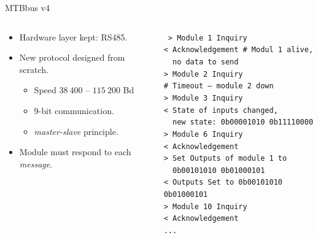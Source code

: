 \documentclass[aspectratio=169]{beamer}
\begin{document}
\begin{frame}{MTBbus v4}
\begin{columns}
	\begin{column}{.5\textwidth}
		\begin{itemize}
		\item Hardware layer kept: RS485.
		\item New protocol designed from scratch.
		\begin{itemize}
			\item Speed $38\ 400$ – $115\ 200$ Bd
			\item 9-bit communication.
			\item \textit{master-slave} principle.
		\end{itemize}
		\item Module must respond to each \textit{message}.
		\end{itemize}
	\end{column}
	\pause
	\begin{column}{.5\textwidth}\texttt{\footnotesize
> Module 1 Inquiry \\
< Acknowledgement  \# Modul 1 alive, \\
  no data to send \\
> Module 2 Inquiry \\
\# Timeout – module 2 down \\
> Module 3 Inquiry \\
< State of inputs changed, \\
  new state: 0b00001010 0b11110000 \\
> Module 6 Inquiry \\
< Acknowledgement \\
> Set Outputs of module 1 to\\
  0b00101010 0b01000101 \\
< Outputs Set to 0b00101010 0b01000101 \\
> Module 10 Inquiry \\
< Acknowledgement \\
...}
	\end{column}
\end{columns}
\end{frame}

\end{document}
